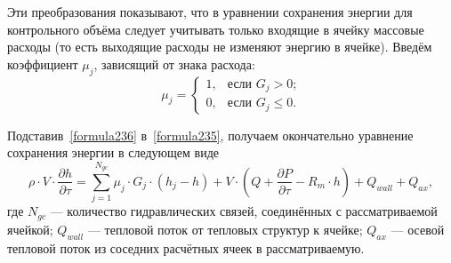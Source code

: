 Эти преобразования показывают, что в уравнении сохранения энергии для контрольного объёма следует учитывать только входящие в ячейку массовые расходы (то есть выходящие расходы не изменяют энергию в ячейке). Введём коэффициент $\mu_j$, зависящий от знака расхода:
$$
\mu_j=\begin{cases}
1,&\text{если $G_j>0$;}\\
0,&\text{если $G_j \le 0$.}
\end{cases}
$$

Подставив~\eqref{formula236} в~\eqref{formula235}, получаем окончательно уравнение сохранения энергии в следующем виде
\begin{equation}
\label{formula237}
\boxed{\rho\cdot V\cdot\frac{\partial h}{\partial\tau}=\sum_{j=1}^{N_{gc}} \mu_j \cdot G_j \cdot (h_j-h)+V\cdot\left(Q+\frac{\partial P}{\partial\tau}-R_m\cdot h \right) + Q_{wall} + Q_{ax}},
\end{equation}
где $N_{gc}$ --- количество гидравлических связей, соединённых с рассматриваемой ячейкой; $Q_{wall}$ --- тепловой поток от тепловых структур к ячейке; $Q_{ax}$ --- осевой тепловой поток из соседних расчётных ячеек в рассматриваемую. 







   







